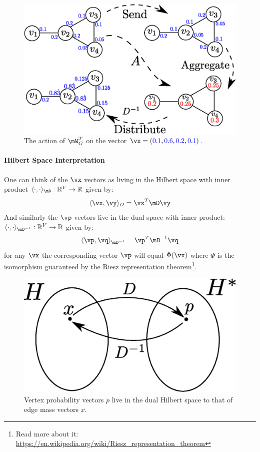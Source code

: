 \begin{figure}[h]
    \centering
    \includegraphics[scale=0.65]{WT.eps}
    \caption{The action of $\mW_G^T$ on the vector $\vx = ({\color{blue}0.1},{\color{blue}0.6},{\color{blue}0.2},{\color{blue}0.1})$.}
    \label{fig:Wt}
\end{figure}

\paragraph{Hilbert Space Interpretation}
One can think of the $\vx$ vectors as living in the Hilbert space with inner product $\langle\cdot ,\cdot\rangle_{\mD}: \R^V \to \R$ given by:
\[
    \langle \vx,\vy \rangle_D = \vx^T\mD\vy
\]
And similarly the $\vp$ vectors live in the dual space with inner product: $\langle \cdot,\cdot\rangle_{\mD^{-1}}: \R^V \to \R$ given by:
\[
    \langle \vp,\vq \rangle_{\mD^{-1}} = \vp^T\mD^{-1}\vq
\]
for any $\vx$ the corresponding vector $\vp$ will equal $\Phi(\vx)$ where $\Phi$ is the isomorphism guaranteed by the Riesz representation theorem\footnote{Read more about it: \url{https://en.wikipedia.org/wiki/Riesz_representation_theorem}}.

\begin{figure}[h]
    \centering
    \includegraphics[scale=.75]{HSpaceSGT.eps}
    \caption{Vertex probability vectors $p$ live in the dual Hilbert space to that of edge mass vectors $x$.}
    \label{fig:my_label}
\end{figure}


